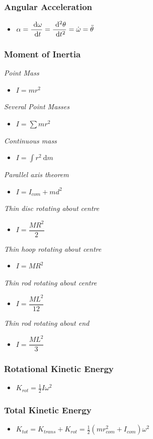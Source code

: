\documentclass[]{report}
\newcommand \tab[1][1cm]{\hspace*{#1}}
\newcommand{\dn}[1]{\ \mathrm{d}#1}
\newcommand{\dd}[2]{ \dfrac{\dn #1}{\dn #2}}
\newcommand{\itemt}{\item \tab}
\begin{document}
\subsubsection{Angular Acceleration}
\begin{itemize}
\itemt \( \alpha = \dd{\omega}{t} = \dd{^2\theta}{t^2} = \dot{\omega} = \ddot{\theta}\)
\end{itemize}

\subsubsection{Moment of Inertia}
\textit{Point Mass}
\begin{itemize}
\itemt \( I = mr^2 \)
\end{itemize}
\textit{Several Point Masses}
\begin{itemize}
\itemt \( I = \sum mr^2 \)
\end{itemize}
\textit{Continuous mass}
\begin{itemize}
\itemt \( I = \int r^2 \dn m \)
\end{itemize}
\textit{Parallel axis theorem}
\begin{itemize}
\itemt \( I = I_{com} + md^2 \)
\end{itemize}
\textit{Thin disc rotating about centre}
\begin{itemize}
\itemt \( I = \dfrac{MR^2}{2} \)
\end{itemize}
\textit{Thin hoop rotating about centre}
\begin{itemize}
\itemt \( I = MR^2 \)
\end{itemize}
\textit{Thin rod rotating about centre}
\begin{itemize}
\itemt \( I = \dfrac{ML^2}{12} \)
\end{itemize}
\textit{Thin rod rotating about end}
\begin{itemize}
\itemt \( I = \dfrac{ML^2}{3} \)
\end{itemize}


\subsubsection{Rotational Kinetic Energy}
\begin{itemize}
\itemt \( K_{rot} = \frac{1}{2} I \omega^2 \)
\end{itemize}

\subsubsection{Total Kinetic Energy}
\begin{itemize}
\itemt \( K_{tot} = K_{trans} + K_{rot} = \frac{1}{2} (mr_{com}^2 + I_{com})\omega^2 \)
\end{itemize}
\end{document}
